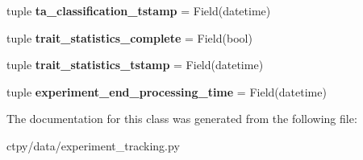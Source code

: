 \begin{DoxyCompactItemize}
\item 
\hypertarget{classctpy_1_1data_1_1experiment__tracking_1_1_experiment_tracking_a0d1d93c5e5027d9413face9446ccb3da}{tuple {\bfseries ta\-\_\-classification\-\_\-tstamp} = Field(datetime)}\label{classctpy_1_1data_1_1experiment__tracking_1_1_experiment_tracking_a0d1d93c5e5027d9413face9446ccb3da}

\item 
\hypertarget{classctpy_1_1data_1_1experiment__tracking_1_1_experiment_tracking_a0190e75dcf9cd377b6e77eb223d00c5c}{tuple {\bfseries trait\-\_\-statistics\-\_\-complete} = Field(bool)}\label{classctpy_1_1data_1_1experiment__tracking_1_1_experiment_tracking_a0190e75dcf9cd377b6e77eb223d00c5c}

\item 
\hypertarget{classctpy_1_1data_1_1experiment__tracking_1_1_experiment_tracking_a59413bb77b9bb4035b06f28afae0f14d}{tuple {\bfseries trait\-\_\-statistics\-\_\-tstamp} = Field(datetime)}\label{classctpy_1_1data_1_1experiment__tracking_1_1_experiment_tracking_a59413bb77b9bb4035b06f28afae0f14d}

\item 
\hypertarget{classctpy_1_1data_1_1experiment__tracking_1_1_experiment_tracking_a9991f135d33eda5fe80d1290f90a96b3}{tuple {\bfseries experiment\-\_\-end\-\_\-processing\-\_\-time} = Field(datetime)}\label{classctpy_1_1data_1_1experiment__tracking_1_1_experiment_tracking_a9991f135d33eda5fe80d1290f90a96b3}

\end{DoxyCompactItemize}


The documentation for this class was generated from the following file\-:\begin{DoxyCompactItemize}
\item 
ctpy/data/experiment\-\_\-tracking.\-py\end{DoxyCompactItemize}
